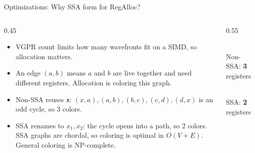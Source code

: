 \documentclass[10pt,aspectratio=169]{beamer}
\begin{document}
        \begin{frame}{Optimizations: Why SSA form for RegAlloc?}
    \hspace*{1.2cm}\begin{minipage}{\dimexpr\textwidth-1.2cm}
    \begin{columns}[T]
    \begin{column}{0.45\textwidth}
    \small
    \begin{itemize}
        \item VGPR count limits how many wavefronts fit on a SIMD, so allocation matters.
        \item An edge $(a,b)$ means $a$ and $b$ are live together and need different registers. Allocation is coloring this graph.
        \item Non-SSA reuses \texttt{x}: $(x,a),(a,b),(b,c),(c,d),(d,x)$ is an odd cycle, so 3 colors.
        \item SSA renames to $x_1,x_2$: the cycle opens into a path, so 2 colors. SSA graphs are chordal, so coloring is optimal in $O(V+E)$. General coloring is NP-complete.
    \end{itemize}
    \end{column}
    \begin{column}{0.55\textwidth}
    \centering
    \\[0.1em]
    {\scriptsize Non-SSA: \textbf{3} registers}\\[0.6em]
    \\[0.1em]
    {\scriptsize SSA: \textbf{2} registers}
    \end{column}
    \end{columns}
    \end{minipage}
    \end{frame}
\end{document}
